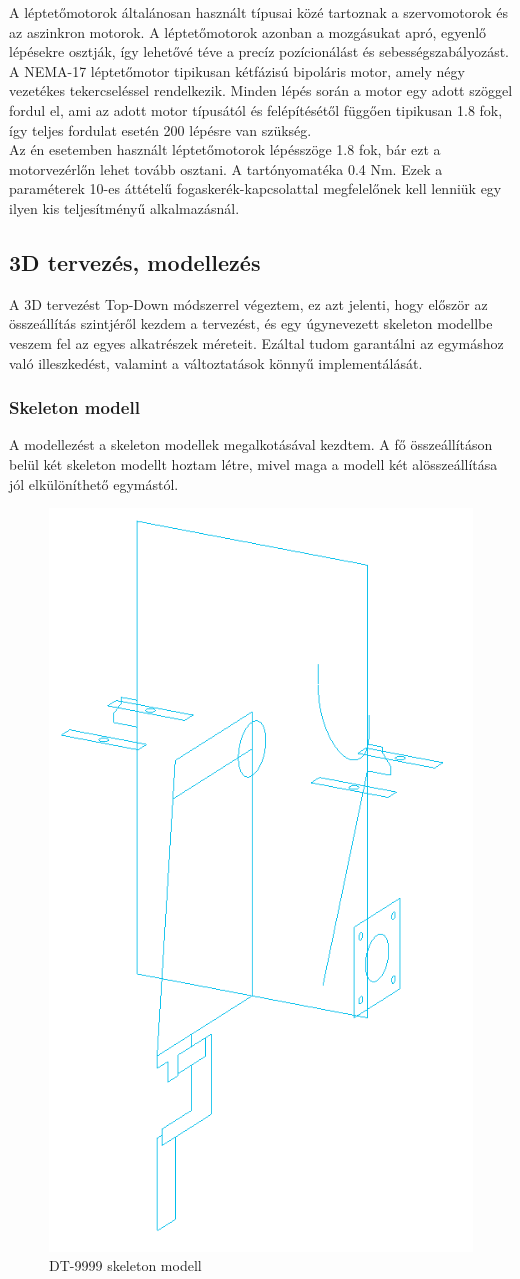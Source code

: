\documentclass[12pt,a4paper]{article}
\begin{document}
A léptetőmotorok általánosan használt típusai közé tartoznak a szervomotorok és az aszinkron motorok. A léptetőmotorok azonban a mozgásukat apró, egyenlő lépésekre osztják, így lehetővé téve a precíz pozícionálást és sebességszabályozást. A NEMA-17 léptetőmotor tipikusan kétfázisú bipoláris motor, amely négy vezetékes tekercseléssel rendelkezik. Minden lépés során a motor egy adott szöggel fordul el, ami az adott motor típusától és felépítésétől függően tipikusan 1.8 fok, így teljes fordulat esetén 200 lépésre van szükség.\\

Az én esetemben használt léptetőmotorok lépésszöge 1.8 fok, bár ezt a motorvezérlőn lehet tovább osztani. A tartónyomatéka 0.4 Nm. Ezek a paraméterek 10-es áttételű fogaskerék-kapcsolattal megfelelőnek kell lenniük egy ilyen kis teljesítményű alkalmazásnál.

\pagebreak

\subsection{3D tervezés, modellezés}
A 3D tervezést Top-Down módszerrel végeztem, ez azt jelenti, hogy először az összeállítás szintjéről kezdem a tervezést, és egy úgynevezett skeleton modellbe veszem fel az egyes alkatrészek méreteit. Ezáltal tudom garantálni az egymáshoz való illeszkedést, valamint a változtatások könnyű implementálását.\\

\subsubsection*{Skeleton modell}
A modellezést a skeleton modellek megalkotásával kezdtem. A fő összeállításon belül két skeleton modellt hoztam létre, mivel maga a modell két alösszeállítása jól elkülöníthető egymástól.

\begin{figure}[h!]
	\centering
	\includegraphics[width=0.5\linewidth]{mech_skeleton1}
	\caption{DT-9999 skeleton modell}
	\label{fig:mech_skeleton1}
\end{figure}
\end{document}
